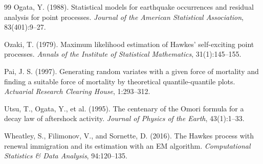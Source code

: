 \documentclass[12pt,a4paper]{report}
\theoremstyle{plain}
\theoremstyle{definition}
\theoremstyle{remark}
\newcommand{\1}{\mathbf{1}}
\begin{document}
\begin{thebibliography}{99}
Ogata, Y. (1988).
\newblock Statistical models for earthquake occurrences and residual analysis for point processes.
\newblock \emph{Journal of the American Statistical Association}, 83(401):9--27.

Ozaki, T. (1979).
\newblock Maximum likelihood estimation of Hawkes' self-exciting point processes.
\newblock \emph{Annals of the Institute of Statistical Mathematics}, 31(1):145--155.

Pai, J. S. (1997).
\newblock Generating random variates with a given force of mortality and finding a suitable force of mortality by theoretical quantile-quantile plots.
\newblock \emph{Actuarial Research Clearing House}, 1:293--312.

Utsu, T., Ogata, Y., et al. (1995).
\newblock The centenary of the Omori formula for a decay law of aftershock activity.
\newblock \emph{Journal of Physics of the Earth}, 43(1):1--33.

Wheatley, S., Filimonov, V., and Sornette, D. (2016).
\newblock The Hawkes process with renewal immigration and its estimation with an EM algorithm.
\newblock \emph{Computational Statistics \& Data Analysis}, 94:120--135.

\end{thebibliography}
\end{document}

